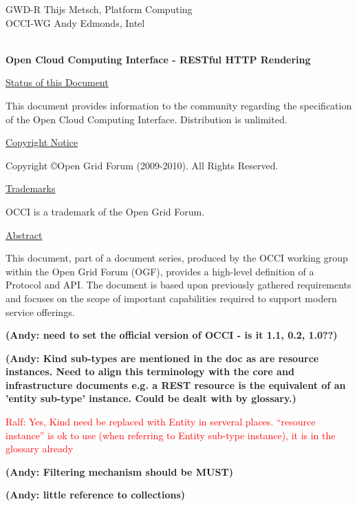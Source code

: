 \documentclass[10pt,a4paper]{article}
\newcommand{\ralf}[1]{\textcolor{red}{Ralf: #1}}
\begin{document}
\thispagestyle{empty}

GWD-R \hfill Thijs Metsch, Platform Computing\\
OCCI-WG \hfill Andy Edmonds, Intel\\
\\

\vspace*{0.5in}

\begin{Large}
\textbf{Open Cloud Computing Interface - RESTful HTTP Rendering}
\end{Large}

\vspace*{0.5in}

\underline{Status of this Document}

This document provides information to the community regarding the
specification of the Open Cloud Computing Interface. Distribution is
unlimited.

\underline{Copyright Notice}

Copyright \copyright Open Grid Forum (2009-2010). All Rights Reserved.

\underline{Trademarks}

OCCI is a trademark of the Open Grid Forum.

\underline{Abstract}

This document, part of a document series, produced by the OCCI working
group within the Open Grid Forum (OGF), provides a high-level
definition of a Protocol and API. The document is based upon
previously gathered requirements and focuses on the scope of important
capabilities required to support modern service offerings.

\textbf{(Andy: need to set the official version of OCCI - is it 1.1, 0.2, 1.0??)}

\textbf{(Andy: Kind sub-types are mentioned in the doc as are resource instances. Need to align this terminology with the core and infrastructure documents e.g. a REST resource is the equivalent of an 'entity sub-type' instance. Could be dealt with by glossary.)}

\ralf{Yes, Kind need be replaced with Entity in serveral places. ``resource instance'' is ok to use (when referring to Entity sub-type instance), it is in the glossary already}

\textbf{(Andy: Filtering mechanism should be MUST)}

\textbf{(Andy: little reference to collections)}
\end{document}

